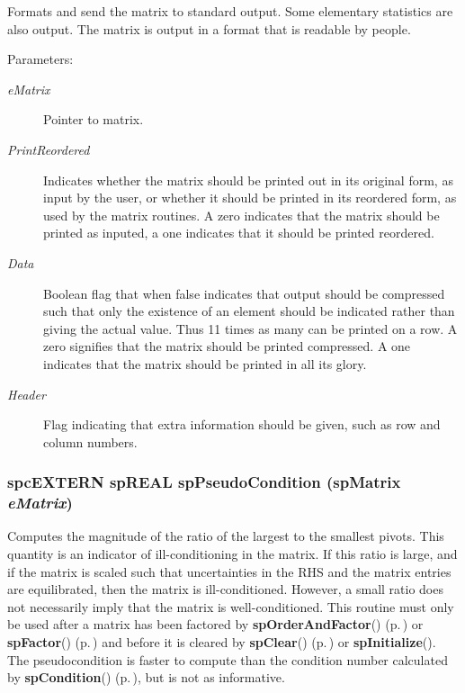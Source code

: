 Formats and send the matrix to standard output. Some elementary statistics are also output. The matrix is output in a format that is readable by people.\begin{Desc}
\item[Parameters: ]\par
\begin{description}
\item[{\em 
e\-Matrix}]Pointer to matrix. \item[{\em 
Print\-Reordered}]Indicates whether the matrix should be printed out in its original form, as input by the user, or whether it should be printed in its reordered form, as used by the matrix routines. A zero indicates that the matrix should be printed as inputed, a one indicates that it should be printed reordered. \item[{\em 
Data}]Boolean flag that when false indicates that output should be compressed such that only the existence of an element should be indicated rather than giving the actual value. Thus 11 times as many can be printed on a row. A zero signifies that the matrix should be printed compressed. A one indicates that the matrix should be printed in all its glory. \item[{\em 
Header}]Flag indicating that extra information should be given, such as row and column numbers. \end{description}
\end{Desc}
\subsubsection{\setlength{\rightskip}{0pt plus 5cm}spc\-EXTERN sp\-REAL sp\-Pseudo\-Condition ({\bf sp\-Matrix} {\em e\-Matrix})}\label{spMatrix_8h_a49}


Computes the magnitude of the ratio of the largest to the smallest pivots. This quantity is an indicator of ill-conditioning in the matrix. If this ratio is large, and if the matrix is scaled such that uncertainties in the RHS and the matrix entries are equilibrated, then the matrix is ill-conditioned. However, a small ratio does not necessarily imply that the matrix is well-conditioned. This routine must only be used after a matrix has been factored by {\bf sp\-Order\-And\-Factor}() {\rm (p.\,\pageref{spMatrix_8h_a46})} or {\bf sp\-Factor}() {\rm (p.\,\pageref{spMatrix_8h_a30})} and before it is cleared by {\bf sp\-Clear}() {\rm (p.\,\pageref{spMatrix_8h_a22})} or {\bf sp\-Initialize}(). The pseudocondition is faster to compute than the condition number calculated by {\bf sp\-Condition}() {\rm (p.\,\pageref{spMatrix_8h_a23})}, but is not as informative.

